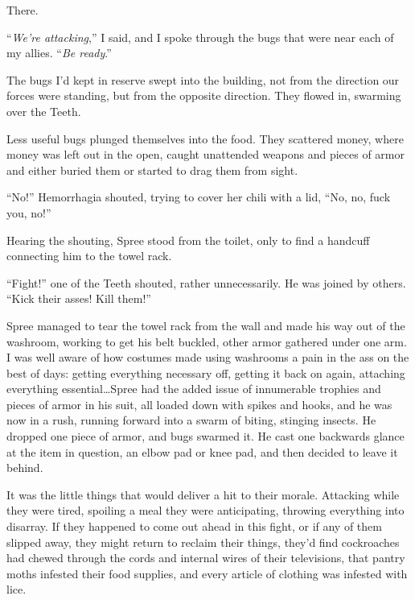 There.



``\emph{We're attacking},'' I said, and I spoke through the bugs that were near each of my allies.  ``\emph{Be ready}.''



The bugs I'd kept in reserve swept into the building, not from the direction our forces were standing, but from the opposite direction.  They flowed in, swarming over the Teeth.



Less useful bugs plunged themselves into the food.  They scattered money, where money was left out in the open, caught unattended weapons and pieces of armor and either buried them or started to drag them from sight.



``No!'' Hemorrhagia shouted, trying to cover her chili with a lid,  ``No, no, fuck you, no!''



Hearing the shouting, Spree stood from the toilet, only to find a handcuff connecting him to the towel rack.



``Fight!'' one of the Teeth shouted, rather unnecessarily.  He was joined by others.  ``Kick their asses!  Kill them!''



Spree managed to tear the towel rack from the wall and made his way out of the washroom, working to get his belt buckled, other armor gathered under one arm.  I was well aware of how costumes made using washrooms a pain in the ass on the best of days: getting everything necessary off, getting it back on again, attaching everything essential\ldots Spree had the added issue of innumerable trophies and pieces of armor in his suit, all loaded down with spikes and hooks, and he was now in a rush, running forward into a swarm of biting, stinging insects.  He dropped one piece of armor, and bugs swarmed it.  He cast one backwards glance at the item in question, an elbow pad or knee pad, and then decided to leave it behind.



It was the little things that would deliver a hit to their morale.  Attacking while they were tired, spoiling a meal they were anticipating, throwing everything into disarray.  If they happened to come out ahead in this fight, or if any of them slipped away, they might return to reclaim their things, they'd find cockroaches had chewed through the cords and internal wires of their televisions, that pantry moths infested their food supplies, and every article of clothing was infested with lice.




